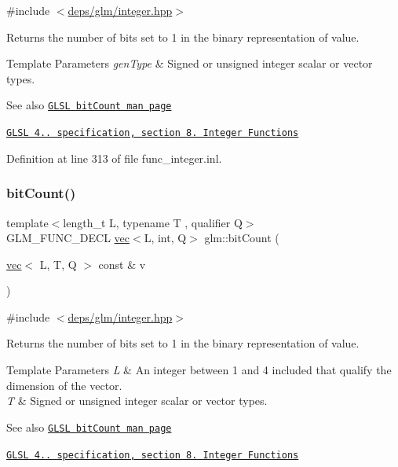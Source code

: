{\ttfamily \#include $<$\hyperlink{integer_8hpp}{deps/glm/integer.\+hpp}$>$}

Returns the number of bits set to 1 in the binary representation of value.


\begin{DoxyTemplParams}{Template Parameters}
{\em gen\+Type} & Signed or unsigned integer scalar or vector types.\\
\hline
\end{DoxyTemplParams}
\begin{DoxySeeAlso}{See also}
\href{http://www.opengl.org/sdk/docs/manglsl/xhtml/bitCount.xml}{\tt G\+L\+SL bit\+Count man page} 

\href{http://www.opengl.org/registry/doc/GLSLangSpec.4.20.8.pdf}{\tt G\+L\+SL 4.. specification, section 8. Integer Functions} 
\end{DoxySeeAlso}


Definition at line 313 of file func\+\_\+integer.\+inl.

\mbox{\label{group__core__func__integer_gaac7b15e40bdea8d9aa4c4cb34049f7b5}} 
\subsubsection{\texorpdfstring{bit\+Count()}{bitCount()}\hspace{0.1cm}{\footnotesize\ttfamily [2/2]}}
{\footnotesize\ttfamily template$<$length\+\_\+t L, typename T , qualifier Q$>$ \\
G\+L\+M\+\_\+\+F\+U\+N\+C\+\_\+\+D\+E\+CL \hyperlink{structglm_1_1vec}{vec}$<$L, int, Q$>$ glm\+::bit\+Count (\begin{DoxyParamCaption}\item[{\hyperlink{structglm_1_1vec}{vec}$<$ L, T, Q $>$ const \&}]{v }\end{DoxyParamCaption})}



{\ttfamily \#include $<$\hyperlink{integer_8hpp}{deps/glm/integer.\+hpp}$>$}

Returns the number of bits set to 1 in the binary representation of value.


\begin{DoxyTemplParams}{Template Parameters}
{\em L} & An integer between 1 and 4 included that qualify the dimension of the vector. \\
\hline
{\em T} & Signed or unsigned integer scalar or vector types.\\
\hline
\end{DoxyTemplParams}
\begin{DoxySeeAlso}{See also}
\href{http://www.opengl.org/sdk/docs/manglsl/xhtml/bitCount.xml}{\tt G\+L\+SL bit\+Count man page} 

\href{http://www.opengl.org/registry/doc/GLSLangSpec.4.20.8.pdf}{\tt G\+L\+SL 4.. specification, section 8. Integer Functions} 
\end{DoxySeeAlso}


